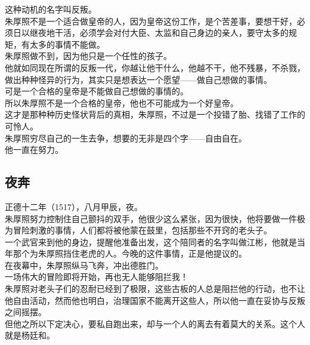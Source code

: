 \begin{multicols}{\theparacolNo}
这种动机的名字叫反叛。\\

朱厚照不是一个适合做皇帝的人，因为皇帝这份工作，是个苦差事，要想干好，必须日以继夜地干活，必须学会对付大臣、太监和自己身边的亲人，要守太多的规矩，有太多的事情不能做。\\

朱厚照做不到，因为他只是一个任性的孩子。\\

他就如同现在所谓的反叛一代，你越让他干什么，他越不干，他不残暴，不杀戮，做出种种怪异的行为，其实只是想表达一个愿望——做自己想做的事情。\\

可是一个合格的皇帝是不能做自己想做的事情的。\\

所以朱厚照不是一个合格的皇帝，他也不可能成为一个好皇帝。\\

这才是那种种历史怪状背后的真相，朱厚照，不过是一个投错了胎、找错了工作的可怜人。\\

朱厚照穷尽自己的一生去争，想要的无非是四个字——自由自在。\\

他一直在努力。\\

\subsection{夜奔}
正德十二年（1517），八月甲辰，夜。\\

朱厚照努力控制住自己颤抖的双手，他很少这么紧张，因为很快，他将要做一件极为冒险刺激的事情，人们都将被他蒙在鼓里，包括那些不开窍的老头子。\\

一个武官来到他的身边，提醒他准备出发，这个陪同者的名字叫做江彬，他就是当年那个为朱厚照挡住老虎的人。今晚的这件事情，正是他提议的。\\

在夜幕中，朱厚照纵马飞奔，冲出德胜门。\\

一场伟大的冒险即将开始，再也无人能够阻拦我！\\

朱厚照对老头子们的忍耐已经到了极限，这些古板的人总是阻拦他的行动，也不让他自由活动，然而他也明白，治理国家不能离开这些人，所以他一直在妥协与反叛之间摇摆。\\

但他之所以下定决心，要私自跑出来，却与一个人的离去有着莫大的关系。这个人就是杨廷和。\\


\end{multicols}
